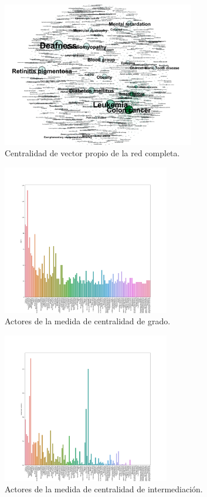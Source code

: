 \documentclass{uimppracticas}
\begin{document}
\begin{figure}[H]
	\centering
	\includegraphics[width=0.75\textwidth]{images/Eigenvector-Centrality-Graph}
	\caption{Centralidad de vector propio de la red completa.}
	\label{Eigenvector-Centrality-Graph}
\end{figure}

\begin{figure}[H]
	\centering
	\includegraphics[width=0.65\textwidth]{images/degree}
	\caption{Actores de la medida de centralidad de grado.}
	\label{degree}
\end{figure}

\begin{figure}[H]
	\centering
	\includegraphics[width=0.65\textwidth]{images/betweenesscentrality}
	\caption{Actores de la medida de centralidad de intermediación.}
	\label{betweenesscentrality}
\end{figure}
\end{document}
